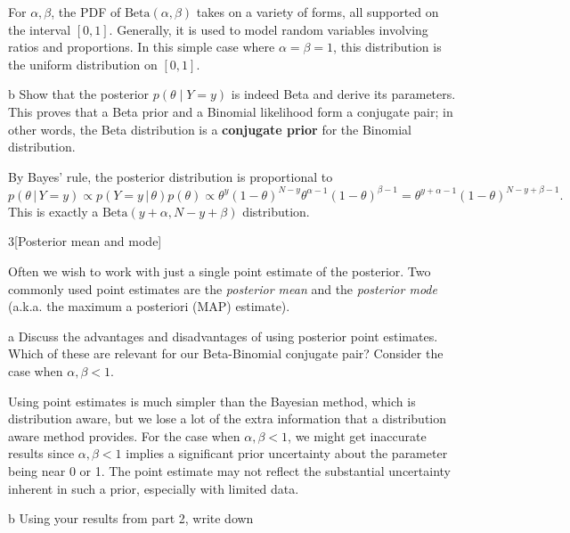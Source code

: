 \documentclass[expanded]{lkx_pset}
\begin{document}
\begin{solution}
\begin{solution}
		For $\alpha,\beta$, the PDF of $\textrm{Beta}(\alpha, \beta)$ takes on a variety of forms, all supported on the interval $[0,1]$. Generally, it is used to model random variables involving ratios and proportions. In this simple case where $\alpha=\beta=1$, this distribution is the uniform distribution on $[0,1]$.

		\begin{part}{b}
			Show that the posterior
			\(p(\theta \mid Y=y)\) is indeed Beta and derive its parameters. This proves that a Beta prior and a Binomial likelihood form a conjugate pair; in other words, the Beta distribution is a \textbf{conjugate prior} for the Binomial distribution.
		\end{part}
		By Bayes' rule, the posterior distribution is proportional to
		\[
			p(\theta \,|\, Y=y)\propto p(Y=y\,|\,\theta) p(\theta)\propto \theta^y(1-\theta)^{N-y}\theta^{\alpha-1}(1-\theta)^{\beta-1}=\theta^{y+\alpha-1}(1-\theta)^{N-y+\beta-1}.
		\]
		This is exactly a $\textrm{Beta}(y+\alpha, N-y+\beta)$ distribution.
	\end{solution}

	\begin{part}{3}[Posterior mean and mode]
	\end{part}
	\begin{solution}
		Often we wish to work with just a
		single point estimate of the posterior. Two commonly used point
		estimates are the \emph{posterior mean} and the \emph{posterior mode}
		(a.k.a. the maximum a posteriori (MAP) estimate).

		\begin{part}{a}
			Discuss the advantages and disadvantages of using posterior point
			estimates. Which of these are relevant for our Beta-Binomial conjugate pair? Consider the case when $\alpha, \beta < 1$.
		\end{part}

		Using point estimates is much simpler than the Bayesian method, which is distribution aware, but we lose a lot of the extra information that a distribution aware method provides. For the case when $\alpha,\beta <1$, we might get inaccurate results since $\alpha,\beta<1$ implies a significant prior uncertainty about the parameter being near 0 or 1. The point estimate may not reflect the substantial uncertainty inherent in such a prior, especially with limited data.

		\begin{part}{b}
			Using your results from part 2, write down


\end{part}
\end{solution}
\end{solution}
\end{document}
